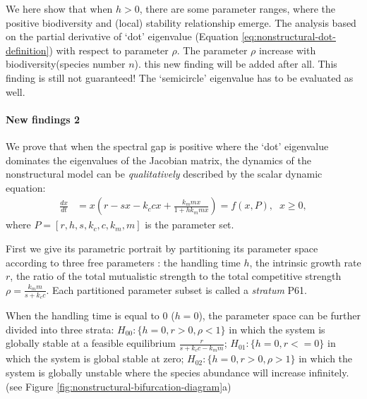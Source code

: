 \documentclass[a4paper,fleqn,12pt]{article}
\begin{document}
We here show that when $h>0$, there are some parameter ranges, where the positive biodiversity and (local) stability relationship emerge.
The analysis based on the partial derivative of `dot' eigenvalue (Equation \ref{eq:nonstructural-dot-definition}) with respect to parameter $\rho$.
The parameter $\rho$ increase with biodiversity(species number $n$).
{\color{red} this new finding will be added after all. 
This finding is still not guaranteed! The `semicircle' eigenvalue has to be evaluated as well.}

\paragraph*{New findings 2}
We prove that when the spectral gap is positive where the `dot' eigenvalue dominates the eigenvalues of the Jacobian matrix, 
the dynamics of the nonstructural model can be \textit{qualitatively} described by the scalar dynamic equation:
\begin{align} \label{eq:nonstructrual-dynamic-model}
\frac{dx}{dt} &= x(r - sx -k_ccx + \frac{k_m m x}{1+hk_m m x}) = f(x,P), \;\; x \ge 0, 
\end{align}
where $P = [r, h, s, k_c, c, k_m, m]$ is the parameter set.

First we give its parametric portrait by partitioning its parameter space
according to three free parameters : the handling time $h$, the intrinsic growth rate $r$, the ratio of the total mutualistic strength to the total competitive strength $\rho = \frac{k_mm}{s+k_cc}$.
Each partitioned parameter subset is called a \textit{stratum} \cite{kuznetsov_elements_2013}P61.


When the handling time is equal to 0 ($h = 0$), the parameter space can be further divided into three strata:
$H_{00}:\{h = 0, r > 0, \rho < 1\}$ in which the system is globally stable at a feasible equilibrium $\frac{r}{s+k_cc - k_mm}$;
$H_{01}:\{h = 0, r <= 0\}$ in which the system is global stable at zero;
$H_{02}:\{h = 0, r > 0, \rho > 1\}$ in which the system is globally unstable where the species abundance will increase infinitely.
(see Figure \ref{fig:nonstructural-bifurcation-diagram}a)
\end{document}
